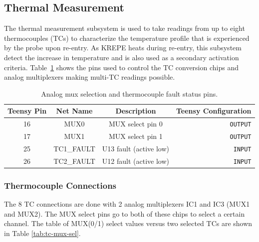 \documentclass{article}
\begin{document}
\subsection{Thermal Measurement}
The thermal measurement subsystem is used to take readings from up to eight thermocouples (TCs) to characterize the temperature profile that is experienced by the probe upon re-entry. As KREPE heats during re-entry, this subsystem detect the increase in temperature and is also used as a secondary activation criteria. Table~\ref{tab:pins_thermo} shows the pins used to control the TC conversion chips and analog multiplexers making multi-TC readings possible.

\begin{table}[H]
    \centering
    \caption{Analog mux selection and thermocouple fault status pins.}
    \label{tab:pins_thermo}
    \begin{tabular}{c|c|c|r}
    Teensy Pin & Net Name  & Description   & Teensy Configuration \\
    \hline 
    16 & MUX0 & MUX select pin 0 & \texttt{OUTPUT} \\
    17 & MUX1 & MUX select pin 1 & \texttt{OUTPUT} \\
    25 & TC1\_FAULT & U13 fault (active low) & \texttt{INPUT} \\
    26 & TC2\_FAULT & U12 fault (active low) & \texttt{INPUT} \\ 
    \end{tabular}
\end{table}

\subsubsection{Thermocouple Connections}
The 8 TC connections are done with 2 analog multiplexers IC1 and IC3 (MUX1 and MUX2). The MUX select pins go to both of these chips to select a certain channel. The table of MUX(0/1) select values versus two selected TCs are shown in Table \ref{tab:tc-mux-sel}.
\end{document}
